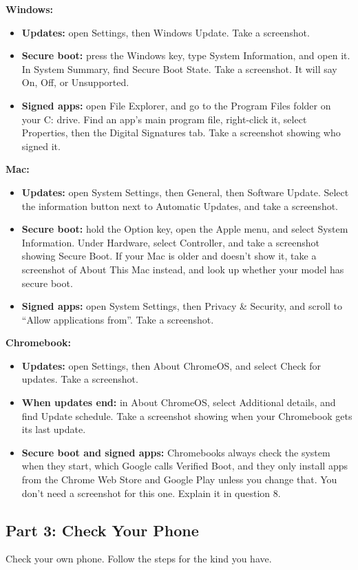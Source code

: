 \documentclass[12pt]{article}
\begin{document}
\textbf{Windows:}
\begin{itemize}
    \item \textbf{Updates:} open Settings, then Windows Update. Take a screenshot.
    \item \textbf{Secure boot:} press the Windows key, type System Information, and open it. In System Summary, find Secure Boot State. Take a screenshot. It will say On, Off, or Unsupported.
    \item \textbf{Signed apps:} open File Explorer, and go to the Program Files folder on your C: drive. Find an app's main program file, right-click it, select Properties, then the Digital Signatures tab. Take a screenshot showing who signed it.
\end{itemize}
\textbf{Mac:}
\begin{itemize}
    \item \textbf{Updates:} open System Settings, then General, then Software Update. Select the information button next to Automatic Updates, and take a screenshot.
    \item \textbf{Secure boot:} hold the Option key, open the Apple menu, and select System Information. Under Hardware, select Controller, and take a screenshot showing Secure Boot. If your Mac is older and doesn't show it, take a screenshot of About This Mac instead, and look up whether your model has secure boot.
    \item \textbf{Signed apps:} open System Settings, then Privacy \& Security, and scroll to ``Allow applications from''. Take a screenshot.
\end{itemize}
\textbf{Chromebook:}
\begin{itemize}
    \item \textbf{Updates:} open Settings, then About ChromeOS, and select Check for updates. Take a screenshot.
    \item \textbf{When updates end:} in About ChromeOS, select Additional details, and find Update schedule. Take a screenshot showing when your Chromebook gets its last update.
    \item \textbf{Secure boot and signed apps:} Chromebooks always check the system when they start, which Google calls Verified Boot, and they only install apps from the Chrome Web Store and Google Play unless you change that. You don't need a screenshot for this one. Explain it in question 8.
\end{itemize}

\subsection*{Part 3: Check Your Phone}
Check your own phone. Follow the steps for the kind you have.
\end{document}
